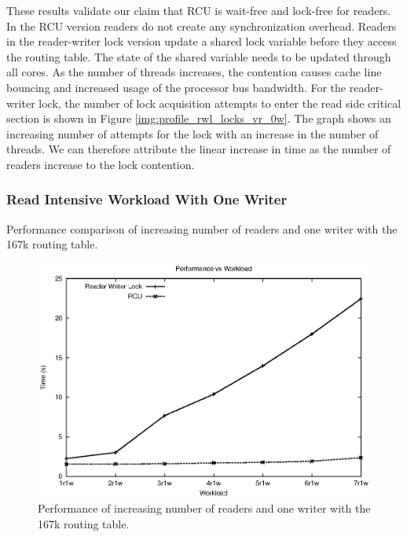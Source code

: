 \documentclass[a4paper,marginparwidth=50pt,marginparsep=10pt]{article}
\begin{document}
These results validate our claim that RCU is wait-free and lock-free
for readers. In the RCU version readers do not create any
synchronization overhead. Readers in the reader-writer lock version
update a shared lock variable before they access the routing
table. The state of the shared variable needs to be updated through
all cores. As the number of threads increases, the contention causes
cache line bouncing and increased usage of the processor bus
bandwidth. For the reader-writer lock, the number of lock acquisition attempts to enter
the read side critical section is shown in Figure \ref{img:profile_rwl_locks_vr_0w}. The graph shows an increasing number of attempts for the lock with an increase in the number of threads. We can therefore attribute the  linear increase in time as the number of readers increase to the lock contention. 

\subsubsection{Read Intensive Workload With One Writer}
\begin{table}[tph]
\begin{center}

\end{center}
\caption{Performance comparison of increasing number of readers and one writer with the 167k routing table.}
\label{tbl:macro_vr_1w}
\end{table}


\begin{figure}[tph]
\includegraphics[scale = 0.7]{../images/graphs/macro_vr_1w}
\caption{Performance of increasing number of readers and one writer with the 167k routing table.}
\label{img:macro_vr_1w}
\end{figure}
\end{document}
